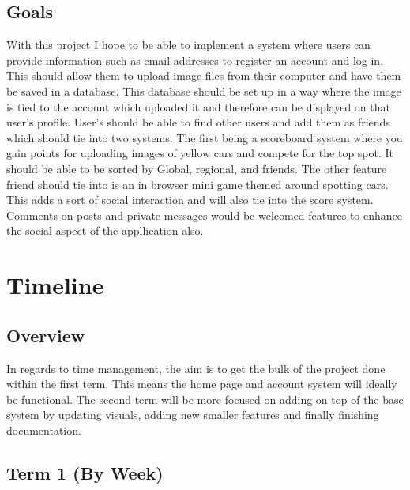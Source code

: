 \documentclass{article}
\begin{document}
\subsection{Goals}
With this project I hope to be able to implement a system where users can provide information such as email addresses to register an account and log in. This should allow them to upload image files from their computer and have them be saved in a database. This database should be set up in a way where the image is tied to the account which uploaded it and therefore can be displayed on that user's profile. User's should be able to find other users and add them as friends which should tie into two systems. The first being a scoreboard system where you gain points for uploading images of yellow cars and compete for the top spot. It should be able to be sorted by Global, regional, and friends. The other feature friend should tie into is an in browser mini game themed around spotting cars. This adds a sort of social interaction and will also tie into the score system. Comments on posts and private messages would be welcomed features to enhance the social aspect of the appllication also.

\section{Timeline}

\subsection{Overview}
In regards to time management, the aim is to get the bulk of the project done within the first term. This means the home page and account system will ideally be functional. The second term will be more focused on adding on top of the base system by updating visuals, adding new smaller features and finally finishing documentation.

\subsection{Term 1 (By Week)}
\end{document}
